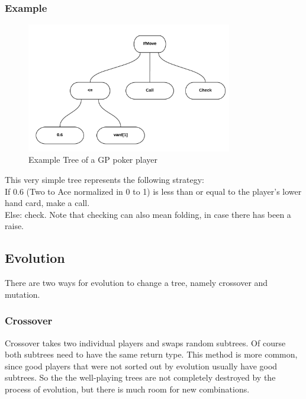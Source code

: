 \documentclass[12pt,fleqn,a4paper]{article}
\begin{document}
\newpage

\subsubsection{Example}
\begin{figure}[!ht]
\begin{center}
	\includegraphics[width=0.8\textwidth]{tree1.png}
\caption{Example Tree of a GP poker player}
\end{center}
\end{figure}
This very simple tree represents the following strategy:
~\\
If 0.6 (Two to Ace normalized in 0 to 1) is less than or equal to the player's lower hand card, make a call.\\
Else: check. Note that checking can also mean folding, in case there has been a raise.

\subsection{Evolution}
\label{evolution}
There are two ways for evolution to change a tree, namely crossover and mutation.

\subsubsection{Crossover}
Crossover takes two individual players and swaps random subtrees.
Of course both subtrees need to have the same return type.
This method is more common, since good players that were not sorted out by evolution usually have good subtrees.
So the the well-playing trees are not completely destroyed by the process of evolution, but there is much room for new combinations.
\end{document}
